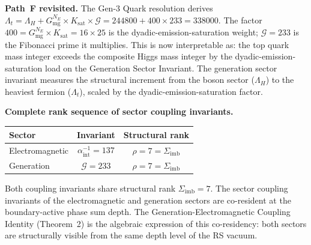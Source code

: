\documentclass[11pt, letterpaper]{article}
\theoremstyle{definition}
\theoremstyle{plain}
\begin{document}
\begin{observebox}
\noindent\textbf{Path~F revisited.}
The Gen-3 Quark resolution derives $\Lambda_t = \Lambda_H + G_\mathrm{mg}^{N_E}
\times K_\mathrm{sat} \times \mathcal{G} = 244800 + 400 \times 233 = 338000$. The
factor $400 = G_\mathrm{mg}^{N_E} \times K_\mathrm{sat} = 16 \times 25$ is the
dyadic-emission-saturation weight; $\mathcal{G} = 233$ is the Fibonacci prime it
multiplies. This is now interpretable as: the top quark mass integer exceeds the
composite Higgs mass integer by the dyadic-emission-saturation load on the Generation
Sector Invariant. The generation sector invariant measures the structural increment
from the boson sector ($\Lambda_H$) to the heaviest fermion ($\Lambda_t$), scaled by
the dyadic-emission-saturation factor.

\noindent\textbf{Complete rank sequence of sector coupling invariants.}

\medskip
\begin{center}
\begin{tabular}{lcc}
\hline
Sector & Invariant & Structural rank \\
\hline
Electromagnetic & $\alpha^{-1}_\mathrm{int} = 137$ & $\rho = 7 = \Sigma_\mathrm{imb}$ \\
Generation & $\mathcal{G} = 233$ & $\rho = 7 = \Sigma_\mathrm{imb}$ \\
\hline
\end{tabular}
\end{center}

\medskip
Both coupling invariants share structural rank $\Sigma_\mathrm{imb} = 7$. The sector
coupling invariants of the electromagnetic and generation sectors are co-resident at
the boundary-active phase sum depth. The Generation-Electromagnetic Coupling Identity
(Theorem~2) is the algebraic expression of this co-residency: both sectors are
structurally visible from the same depth level of the RS vacuum.
\end{observebox}
\end{document}
